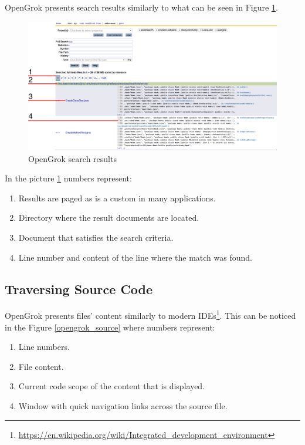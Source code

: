 OpenGrok presents search results similarly to what can be seen in Figure \ref{opengrok_results}.

\begin{figure}[htbp]
    \centering
    \includegraphics[width=145mm]{../img/opengrok_results.png}
    \caption{OpenGrok search results}
    \label{opengrok_results}
\end{figure}

In the picture \ref{opengrok_results} numbers represent:
\begin{enumerate}
    \item Results are paged as is a custom in many applications.
    \item Directory where the result documents are located.
    \item Document that satisfies the search criteria.
    \item Line number and content of the line where the match was found.
\end{enumerate}

\subsection{Traversing Source Code}

OpenGrok presents files' content similarly to modern
IDEs\footnote{\url{https://en.wikipedia.org/wiki/Integrated_development_environment}}. This can be noticed in the Figure
\ref{opengrok_source} where numbers represent:

\begin{enumerate}
    \item Line numbers.
    \item File content.
    \item Current code scope of the content that is displayed.
    \item Window with quick navigation links across the source file.
\end{enumerate}

